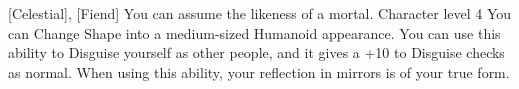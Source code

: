  {[Celestial], [Fiend]}
\shortdescfeat
{You can assume the likeness of a mortal.}
{Character level 4}
{You can Change Shape into a medium-sized Humanoid appearance. You can use this ability to Disguise yourself as other people, and it gives a +10 to Disguise checks as normal. When using this ability, your reflection in mirrors is of your true form.}